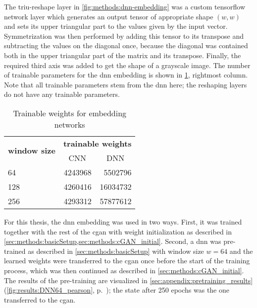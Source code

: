 The triu-reshape layer in \cref{fig:methods:dnn-embedding} was a custom tensorflow network layer which generates an output tensor
of appropriate shape $(w,w)$ and sets its upper triangular part to the values given by the input vector.
Symmetrization was then performed by adding this tensor to its transpose and subtracting the values on the diagonal once,
because the diagonal was contained both in the upper triangular part of the matrix and its transpose.
Finally, the required third axis was added to get the shape of a grayscale image.
The number of trainable parameters for the \acrshort{dnn} embedding is shown in \cref{tab:methods:embedding_network_params}, rightmost column.
Note that all trainable parameters stem from the \acrshort{dnn} here; the reshaping layers do not have any trainable parameters.
\begin{table}[htbp]
\centering
\begin{tabular}{lrr}
\hline
\multicolumn{1}{c}{\multirow{2}{*}{\textbf{window size}}} & \multicolumn{2}{c}{\textbf{trainable weights}}    \\
\multicolumn{1}{c}{}                                     & \multicolumn{1}{c}{CNN} & \multicolumn{1}{c}{DNN} \\ \hline
64                                                       & \SI{4243968}{}                 & \SI{5502796}{}                 \\
128                                                      & \SI{4260416}{}                 & \SI{16034732}{}                \\
256                                                      & \SI{4293312}{}                 & \SI{57877612}{}                \\ \hline
\end{tabular}
\caption{Trainable weights for embedding networks}\label{tab:methods:embedding_network_params}
\end{table}

For this thesis, the \acrshort{dnn} embedding was used in two ways.
First, it was trained together with the rest of the \acrshort{cgan} with weight initialization as described in 
\cref{sec:methods:basicSetup,sec:methods:cGAN_initial}.
Second, a \acrshort{dnn} was pre-trained as described in \cref{sec:methods:basicSetup} with window size $w=64$
and the learned weights were transferred to the \acrshort{cgan} once before the start of the training process,
which was then continued as described in \cref{sec:methods:cGAN_initial}.
The results of the pre-training are visualized in \cref{sec:appendix:pretraining_results} (\cref{fig:results:DNN64_pearson}, p.~\pageref{fig:results:DNN64_pearson});
the state after 250 epochs was the one transferred to the \acrshort{cgan}.

